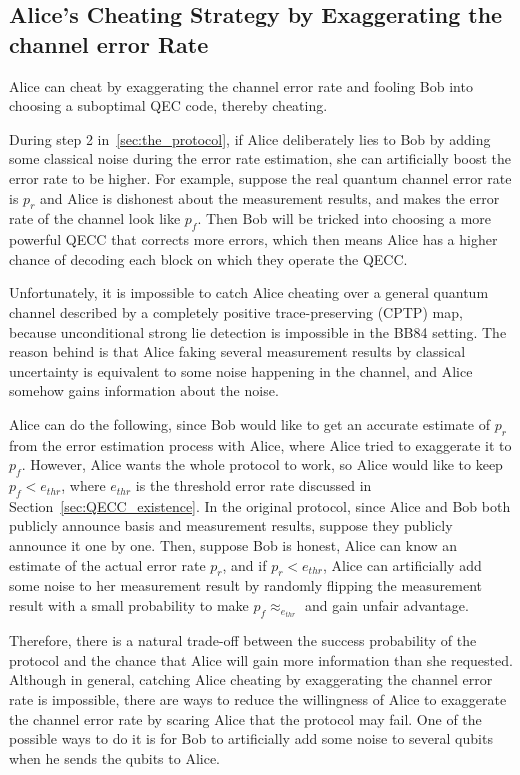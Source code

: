 \documentclass[%
 reprint,
superscriptaddress,
 amsmath,amssymb,
 aps,
]{revtex4-2}
\begin{document}
\subsection{Alice's Cheating Strategy by Exaggerating the channel error Rate}
\label{sec:Alice_cheating_error_rate}

Alice can cheat by exaggerating the channel error rate and fooling Bob into choosing a suboptimal QEC code, thereby cheating.

During step 2 in~\ref{sec:the_protocol}, if Alice deliberately lies to Bob by adding some classical noise during the error rate estimation, she can artificially boost the error rate to be higher. For example, suppose the real quantum channel error rate is $p_r$ and Alice is dishonest about the measurement results, and makes the error rate of the channel look like $p_f$. Then Bob will be tricked into choosing a more powerful QECC that corrects more errors, which then means Alice has a higher chance of decoding each block on which they operate the QECC.

Unfortunately, it is impossible to catch Alice cheating over a general quantum channel described by a completely positive trace-preserving (CPTP) map, because unconditional strong lie detection is impossible in the BB84 setting. The reason behind is that Alice faking several measurement results by classical uncertainty is equivalent to some noise happening in the channel, and Alice somehow gains information about the noise.

Alice can do the following, since Bob would like to get an accurate estimate of $p_r$ from the error estimation process with Alice, where Alice tried to exaggerate it to $p_f$. However, Alice wants the whole protocol to work, so Alice would like to keep $p_f<e_{thr}$, where $e_{thr}$ is the threshold error rate discussed in Section~\ref{sec:QECC_existence}. In the original protocol, since Alice and Bob both publicly announce basis and measurement results, suppose they publicly announce it one by one. Then, suppose Bob is honest, Alice can know an estimate of the actual error rate $p_r$, and if $p_r<e_{thr}$, Alice can artificially add some noise to her measurement result by randomly flipping the measurement result with a small probability to make $p_f\approx_{e_{thr}}$ and gain unfair advantage.

Therefore, there is a natural trade-off between the success probability of the protocol and the chance that Alice will gain more information than she requested. Although in general, catching Alice cheating by exaggerating the channel error rate is impossible, there are ways to reduce the willingness of Alice to exaggerate the channel error rate by scaring Alice that the protocol may fail. One of the possible ways to do it is for Bob to artificially add some noise to several qubits when he sends the qubits to Alice.
\end{document}
